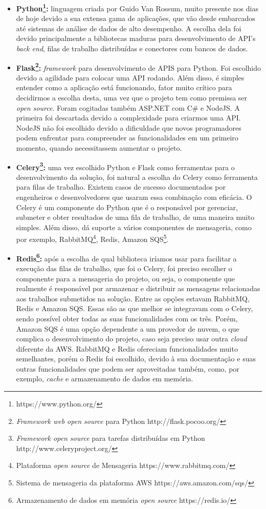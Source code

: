 \documentclass[11pt,twoside]{article}
\begin{document}
\begin{itemize}
  \item \textbf{Python\footnote{https://www.python.org/}:} linguagem criada por Guido Van Rossum, muito presente nos dias de hoje devido a sua extensa gama de aplicações, que vão desde embarcados até sistemas de análise de dados de alto 
  desempenho. A escolha dela foi devido principalmente a bibliotecas maduras para desenvolvimento de API's \emph{back end}, filas de trabalho distribuídas e conectores com bancos de dados.

  \item \textbf{Flask\footnote{\emph{Framework web open source} para Python http://flask.pocoo.org/}:} \emph{framework} para desenvolvimento de APIS para Python. Foi escolhido devido a agilidade para colocar uma API rodando. Além disso, é simples entender como a aplicação está funcionando,
  fator muito crítico para decidirmos a escolha desta, uma vez que o projeto tem como premissa ser \emph{open source}. Foram cogitadas também ASP.NET
  com C\# e NodeJS. A primeira foi descartada devido a complexidade para criarmos uma API. NodeJS não foi escolhido devido a dificuldade que novos programadores podem enfrentar para compreender as
  funcionalidades em um primeiro momento, quando necessitassem aumentar o projeto.

  \item \textbf{Celery\footnote{\emph{Framework open source} para tarefas distribuídas em Python http://www.celeryproject.org/}:} uma vez escolhido Python e Flask como ferramentas para o desenvolvimento da solução, foi natural a escolha do Celery como ferramenta para filas de trabalho. Existem
  casos de sucesso documentados por engenheiros e desenvolvedores que usaram essa combinação com eficácia. O Celery é um componente do Python que é o responsável por gerenciar, submeter e obter
  resultados de uma fila de trabalho, de uma maneira muito simples. Além disso, dá suporte a vários componentes de mensageria, como por exemplo, RabbitMQ\footnote{Plataforma \emph{open source} de Mensageria https://www.rabbitmq.com/}, 
  Redis, Amazon SQS\footnote{Sistema de mensageria da plataforma AWS https://aws.amazon.com/sqs/}.  

  \item \textbf{Redis\footnote{Armazenamento de dados em memória \emph{open source} https://redis.io/}:} após a escolha de qual biblioteca iríamos usar para facilitar a execução das filas de trabalho, que foi o Celery, foi preciso escolher o componente para a mensageria do projeto, ou seja, o
  componente que realmente é responsável por armazenar e distribuir as mensagens relacionadas aos trabalhos submetidos na solução. Entre as opções estavam RabbitMQ, Redis e Amazon SQS. Essas são as que melhor se 
  integravam com o Celery, sendo possível obter todas as suas funcionalidades com os três. Porém, Amazon SQS é uma opção dependente a um provedor de nuvem, o que complica o desenvolvimento do projeto, caso seja 
  preciso usar outra \emph{cloud} diferente da AWS. RabbitMQ e Redis ofereciam funcionalidades muito semelhantes, porém o Redis foi escolhido, devido à sua documentação e suas outras funcionalidades
  que podem ser aproveitadas também, como, por exemplo, \emph{cache} e armazenamento de dados em memória.


\end{itemize}
\end{document}
